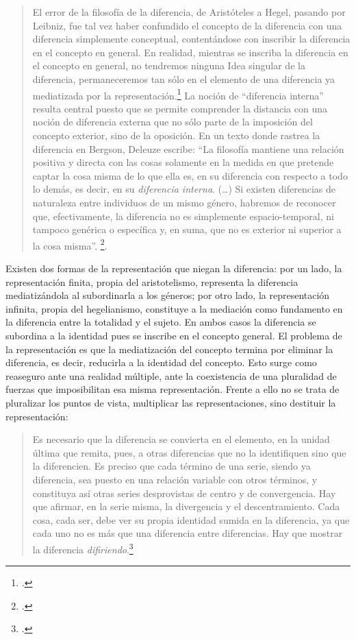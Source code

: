 \begin{quote}
El error de la filosofía de la diferencia, de Aristóteles a Hegel, pasando por Leibniz, fue tal vez haber confundido el concepto de la diferencia con una diferencia simplemente conceptual, contentándose con inscribir la diferencia en el concepto en general. En realidad, mientras se inscriba la diferencia en el concepto en general, no tendremos ninguna Idea singular de la diferencia, permaneceremos tan sólo en el elemento de una diferencia ya mediatizada por la representación.\footcite[58]{@6961-DELEUZE2002} La noción de \enquote{diferencia interna} resulta central puesto que se permite comprender la distancia con una noción de diferencia externa que no sólo parte de la imposición del concepto exterior, sino de la oposición. En un texto donde rastrea la diferencia en Bergson, Deleuze escribe: \enquote{La filosofía mantiene una relación positiva y directa con las cosas solamente en la medida en que pretende captar la cosa misma de lo que ella es, en su diferencia con respecto a todo lo demás, es decir, en su \emph{diferencia interna}. (\dots) Si existen diferencias de naturaleza entre individuos de un mismo género, habremos de reconocer que, efectivamente, la diferencia no es simplemente espacio-temporal, ni tampoco genérica o específica y, en suma, que no es exterior ni superior a la cosa misma}. \footcite[46]{@6975-DELEUZE2005}.
\end{quote}

Existen dos formas de la representación que niegan la diferencia: por un lado, la representación finita, propia del aristotelismo, representa la diferencia mediatizándola al subordinarla a los géneros; por otro lado, la representación infinita, propia del hegelianismo, constituye a la mediación como fundamento en la diferencia entre la totalidad y el sujeto. En ambos casos la diferencia se subordina a la identidad pues se inscribe en el concepto general. El problema de la representación es que la mediatización del concepto termina por eliminar la diferencia, es decir, reducirla a la identidad del concepto. Esto surge como reaseguro ante una realidad múltiple, ante la coexistencia de una pluralidad de fuerzas que imposibilitan esa misma representación. Frente a ello no se trata de pluralizar los puntos de vista, multiplicar las representaciones, sino destituir la representación:

\begin{quote}
Es necesario que la diferencia se convierta en el elemento, en la unidad última que remita, pues, a otras diferencias que no la identifiquen sino que la diferencien. Es preciso que cada término de una serie, siendo ya diferencia, sea puesto en una relación variable con otros términos, y constituya así otras series desprovistas de centro y de convergencia. Hay que afirmar, en la serie misma, la divergencia y el descentramiento. Cada cosa, cada ser, debe ver su propia identidad sumida en la diferencia, ya que cada uno no es más que una diferencia entre diferencias. Hay que mostrar la diferencia \emph{difiriendo}.\footcite[101]{@6961-DELEUZE2002}
\end{quote}

